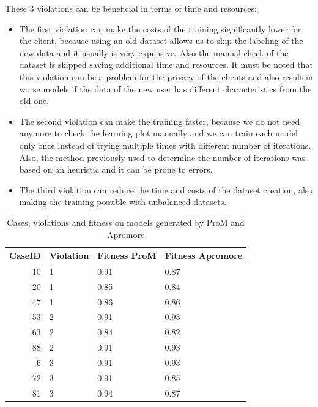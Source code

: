 These 3 violations can be beneficial in terms of time and resources:
\begin{itemize}
    \item The first violation can make the costs of the training significantly
    lower for the client, because using an old dataset allows us to skip 
    the labeling of the new data and it usually is very expensive. 
    Also the manual check of the dataset is skipped saving additional time and
    resources. It must be noted that this violation can be a problem for
    the privacy of the clients and also result in worse models if the data of
    the new user has different characteristics from the old one.
    \item The second violation can make the training faster, because we do not
    need anymore to check the learning plot manually and we can train each
    model only once instead of trying multiple times with different number of
    iterations. Also, the method previously used to determine the number of
    iterations was based on an heuristic and it can be prone to errors.
    \item The third violation can reduce the time and costs of the dataset
    creation, also making the training possible with unbalanced datasets.
\end{itemize}

\begin{table}[H]
\centering
\begin{tabular}{|r|l|l|l|}
\hline
\textbf{CaseID} & \textbf{Violation} & \textbf{Fitness ProM} & \textbf{Fitness Apromore} \\
\hline
10 & 1 & 0.91 & 0.87 \\
\hline
20 & 1 & 0.85 & 0.84 \\
\hline
47 & 1 & 0.86 & 0.86 \\
\hline
53 & 2 & 0.91 & 0.93 \\
\hline
63 & 2 & 0.84 & 0.82 \\
\hline
88 & 2 & 0.91 & 0.93 \\
\hline
6 & 3 & 0.91 & 0.93 \\
\hline
72 & 3 & 0.91 & 0.85 \\
\hline
81 & 3 & 0.94 & 0.87 \\
\hline
\end{tabular}
\caption{Cases, violations and fitness on models generated by ProM and Apromore}
\label{tab:violations}
\end{table}

